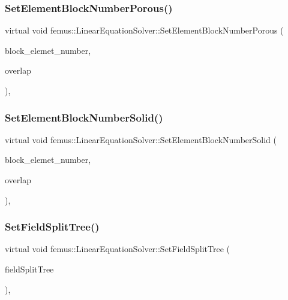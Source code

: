 \subsubsection{\texorpdfstring{Set\+Element\+Block\+Number\+Porous()}{SetElementBlockNumberPorous()}}
{\footnotesize\ttfamily virtual void femus\+::\+Linear\+Equation\+Solver\+::\+Set\+Element\+Block\+Number\+Porous (\begin{DoxyParamCaption}\item[{const unsigned \&}]{block\+\_\+elemet\+\_\+number,  }\item[{const unsigned \&}]{overlap }\end{DoxyParamCaption})\hspace{0.3cm}{\ttfamily [inline]}, {\ttfamily [virtual]}}

\mbox{\label{classfemus_1_1_linear_equation_solver_aad722059ff7cecc7de89a470c831351f}} 
\subsubsection{\texorpdfstring{Set\+Element\+Block\+Number\+Solid()}{SetElementBlockNumberSolid()}}
{\footnotesize\ttfamily virtual void femus\+::\+Linear\+Equation\+Solver\+::\+Set\+Element\+Block\+Number\+Solid (\begin{DoxyParamCaption}\item[{const unsigned \&}]{block\+\_\+elemet\+\_\+number,  }\item[{const unsigned \&}]{overlap }\end{DoxyParamCaption})\hspace{0.3cm}{\ttfamily [inline]}, {\ttfamily [virtual]}}

\mbox{\label{classfemus_1_1_linear_equation_solver_a62683a501b58f6bbda90f7b1d15b1f5a}} 
\subsubsection{\texorpdfstring{Set\+Field\+Split\+Tree()}{SetFieldSplitTree()}}
{\footnotesize\ttfamily virtual void femus\+::\+Linear\+Equation\+Solver\+::\+Set\+Field\+Split\+Tree (\begin{DoxyParamCaption}\item[{\mbox{\hyperlink{classfemus_1_1_field_split_tree}{Field\+Split\+Tree}} $\ast$}]{field\+Split\+Tree }\end{DoxyParamCaption})\hspace{0.3cm}{\ttfamily [inline]}, {\ttfamily [virtual]}}

